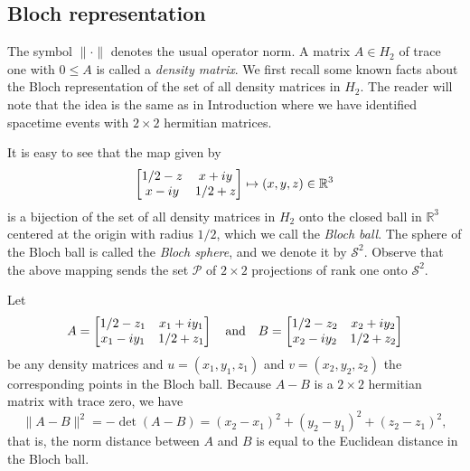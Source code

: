 \documentclass[10pt]{amsart}
\theoremstyle{definition}
\theoremstyle{remark}
\numberwithin{subsection}{section}
\numberwithin{equation}{section}
\newcommand\cP{{\mathcal{P}}}
\begin{document}
\subsection{Bloch representation}\label{projectionsx}
The symbol $\| \cdot \|$ \index{$\lVert \cdot \rVert$} denotes the usual operator norm.
A matrix $A\in H_2$ of trace one with $0\leq A$ is called a \emph{density matrix}.
We first recall some known facts about the Bloch representation  of the set of all density matrices in $H_2$. 
The reader will note that the idea is the same as in Introduction where we have identified spacetime events with $2\times 2$ hermitian matrices. 

It is easy to see that the map
given by
\begin{equation}\label{blochmap}
 \left[ \begin{matrix} 1/2 - z & x+iy \cr x-iy & 1/2 +z \cr \end{matrix} \right] \mapsto (x,y,z) \in \mathbb{R}^3 
\end{equation}
is a bijection of the set of all density matrices in $H_2$ onto the closed ball in $\mathbb{R}^3$ centered at the origin with radius $1/2$, which we call the \emph{Bloch ball}. 
The sphere of the Bloch ball is called the \emph{Bloch sphere}, and we denote it by $\mathcal{S}^2$. 
Observe that the above mapping sends the set $\cP$ of $2\times2$ projections of rank one onto $\mathcal{S}^2$. 

Let
\[
A =  \left[ \begin{matrix} 1/2 - z_1 & x_1+iy_1 \cr x_1-iy_1 & 1/2 +z_1 \cr \end{matrix} \right] \ \ \ \text{and} \ \ \ B =  \left[ \begin{matrix} 1/2 - z_2 & x_2+iy_2 \cr x_2-iy_2 & 1/2 +z_2 \cr \end{matrix} \right]
\]
be any density matrices and $u = (x_1 , y_1 , z_1)$ and $v = (x_2, y_2, z_2)$ the corresponding points in the Bloch ball. 
Because $A-B$ is a $2\times 2$ hermitian matrix with trace zero, we have 
\begin{equation}\label{bb}
\| A - B \|^2 = - \det (A-B)= (x_2 - x_1)^2 + (y_2 - y_1)^2 + (z_2 - z_1)^2,
\end{equation}
that is, the norm distance between $A$ and $B$ is equal to the Euclidean distance in the Bloch ball. 
\end{document}
